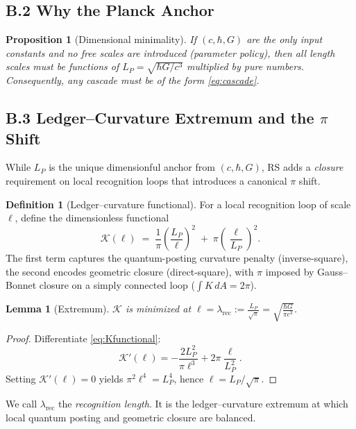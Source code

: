 \documentclass[11pt]{article}
\newtheorem{lemma}[theorem]{Lemma}
\newtheorem{proposition}[theorem]{Proposition}
\theoremstyle{definition}
\newtheorem{definition}[theorem]{Definition}
\theoremstyle{remark}
\begin{document}
\subsection*{B.2 Why the Planck Anchor}
\begin{proposition}[Dimensional minimality]
If $(c,\hbar,G)$ are the only input constants and no free scales are introduced (parameter policy), then all length scales must be functions of $L_P=\sqrt{\hbar G/c^3}$ multiplied by pure numbers. Consequently, any cascade must be of the form \eqref{eq:cascade}.
\end{proposition}

\subsection*{B.3 Ledger–Curvature Extremum and the $\pi$ Shift}
While $L_P$ is the unique dimensionful anchor from $(c,\hbar,G)$, RS adds a \emph{closure} requirement on local recognition loops that introduces a canonical $\pi$ shift.

\begin{definition}[Ledger–curvature functional]
For a local recognition loop of scale $\ell$, define the dimensionless functional
\begin{equation}
\mathcal{K}(\ell)\;=\;\frac{1}{\pi}\left(\frac{L_P}{\ell}\right)^{\!2}\;+\;\pi\left(\frac{\ell}{L_P}\right)^{\!2}.
\label{eq:Kfunctional}
\end{equation}
The first term captures the quantum-posting curvature penalty (inverse-square), the second encodes geometric closure (direct-square), with $\pi$ imposed by Gauss–Bonnet closure on a simply connected loop ($\int K\,dA=2\pi$).
\end{definition}

\begin{lemma}[Extremum]\label{lem:extremum}
$\mathcal{K}$ is minimized at $\displaystyle \ell=\lambda_{\mathrm{rec}}:=\frac{L_P}{\sqrt{\pi}}=\sqrt{\frac{\hbar G}{\pi c^3}}$.
\end{lemma}
\begin{proof}
Differentiate \eqref{eq:Kfunctional}:
\[
\mathcal{K}'(\ell)=-\frac{2L_P^2}{\pi\ell^3}+2\pi\frac{\ell}{L_P^2}.
\]
Setting $\mathcal{K}'(\ell)=0$ yields $\pi^2\ell^4=L_P^4$, hence $\ell=L_P/\sqrt{\pi}$.
\end{proof}

\noindent We call $\lambda_{\mathrm{rec}}$ the \emph{recognition length}. It is the ledger–curvature extremum at which local quantum posting and geometric closure are balanced.
\end{document}
